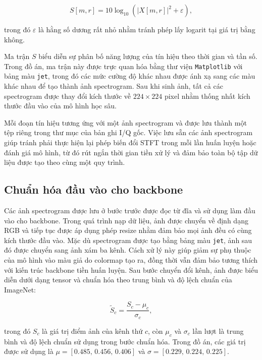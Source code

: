 \documentclass[../DoAn.tex]{subfiles}
\begin{document}
\begin{equation}
    S[m,r]
    =
    10\log_{10}
    \left(
        |X[m,r]|^2+\varepsilon
    \right),
\end{equation}

trong đó $\varepsilon$ là hằng số dương rất nhỏ nhằm tránh phép lấy logarit tại giá trị bằng không.

Ma trận $S$ biểu diễn sự phân bố năng lượng của tín hiệu theo thời gian và tần số. Trong đồ án, ma trận này được trực quan hóa bằng thư viện \texttt{Matplotlib} với bảng màu \texttt{jet}, trong đó các mức cường độ khác nhau được ánh xạ sang các màu khác nhau để tạo thành ảnh spectrogram. Sau khi sinh ảnh, tất cả các spectrogram được thay đổi kích thước về $224\times224$ pixel nhằm thống nhất kích thước đầu vào của mô hình học sâu.

Mỗi đoạn tín hiệu tương ứng với một ảnh spectrogram và được lưu thành một tệp riêng trong thư mục của bản ghi I/Q gốc. Việc lưu sẵn các ảnh spectrogram giúp tránh phải thực hiện lại phép biến đổi STFT trong mỗi lần huấn luyện hoặc đánh giá mô hình, từ đó rút ngắn thời gian tiền xử lý và đảm bảo toàn bộ tập dữ liệu được tạo theo cùng một quy trình.


\subsection{Chuẩn hóa đầu vào cho backbone}

Các ảnh spectrogram được lưu ở bước trước được đọc từ đĩa và sử dụng làm đầu vào cho backbone. Trong quá trình nạp dữ liệu, ảnh được chuyển về định dạng RGB và tiếp tục được áp dụng phép resize nhằm đảm bảo mọi ảnh đều có cùng kích thước đầu vào. Mặc dù spectrogram được tạo bằng bảng màu \texttt{jet}, ảnh sau đó được chuyển sang ảnh xám ba kênh. Cách xử lý này giúp giảm sự phụ thuộc của mô hình vào màu giả do colormap tạo ra, đồng thời vẫn đảm bảo tương thích với kiến trúc backbone tiền huấn luyện. Sau bước chuyển đổi kênh, ảnh được biểu diễn dưới dạng tensor và chuẩn hóa theo trung bình và độ lệch chuẩn của ImageNet:

\begin{equation}
    \widetilde{S}_{c}
    =
    \frac{S_{c}-\mu_c}{\sigma_c},
\end{equation}

trong đó $S_c$ là giá trị điểm ảnh của kênh thứ $c$, còn $\mu_c$ và $\sigma_c$ lần lượt là trung bình và độ lệch chuẩn sử dụng trong bước chuẩn hóa. Trong đồ án, các giá trị được sử dụng là
$\mu=[0.485,\,0.456,\,0.406]$ và
$\sigma=[0.229,\,0.224,\,0.225]$.
\end{document}
